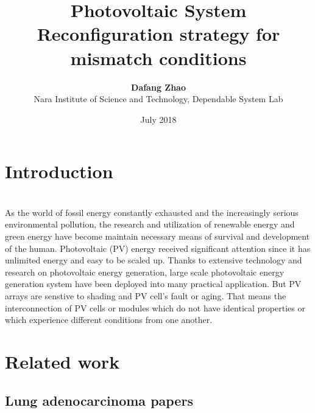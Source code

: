\documentclass[twocolumn,12pt]{article}
\title{\textbf{Photovoltaic System Reconfiguration strategy for mismatch conditions}}%
\date{July 2018}
\author{\textbf{Dafang Zhao}\\Nara Institute of Science and Technology, Dependable System Lab}
\begin{document}
\maketitle

\section{Introduction}
\\As the world of fossil energy constantly exhausted and the increasingly serious environmental pollution, the research and utilization of renewable energy and green energy have become maintain necessary means of survival and development of the human. Photovoltaic (PV) energy received significant attention since it has unlimited energy and easy to be scaled up. Thanks to extensive technology and research on photovoltaic energy generation, large scale photovoltaic energy generation system have been deployed into many practical application. But PV arrays are senstive to shading and PV cell's fault or aging. That means the interconnection of PV cells or modules which do not have identical properties or which experience different conditions from one another.
\section{Related work}
\subsection{Lung adenocarcinoma papers}
\end{document}
